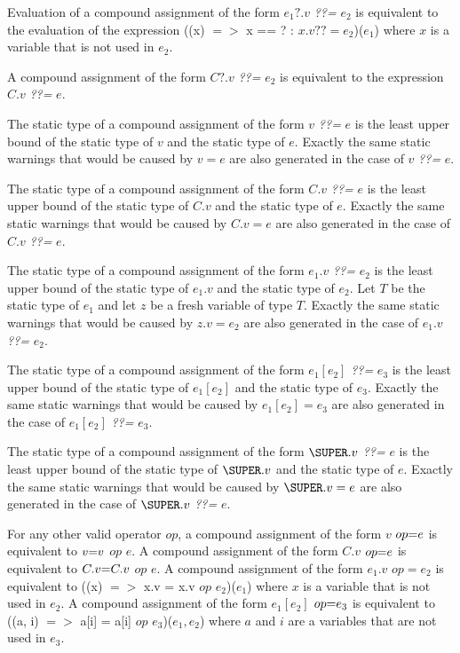 \documentclass{article}
\newcommand{\code}[1]{{\sf #1}}
\begin{document}
\LMHash{}
Evaluation of a compound assignment of the form $e_1?.v$  {\em ??=} $e_2$ is equivalent to the evaluation of the expression \code{((x) $=>$ x == \NULL{} ?  \NULL: $x.v ??=  e_2$)($e_1$)} where $x$ is a variable that is not used in $e_2$.

\LMHash{}
A compound assignment of the form $C?.v$  {\em ??=} $e_2$ is equivalent to the expression $C.v$ {\em ??=} $e$.

\LMHash{}
The static type of a compound assignment of the form $v$ {\em ??=} $e$ is the least upper bound of the static type of $v$ and the static type of $e$.  Exactly the same static warnings that would be caused by $v = e$ are also generated in the case of $v$ {\em ??=} $e$.


\LMHash{}
The static type of a compound assignment of the form  $C.v$ {\em ??=} $e$  is the least upper bound of the static type of $C.v$ and the static type of $e$.  Exactly the same static warnings that would be caused by $C.v = e$ are also generated in the case of $C.v$ {\em ??=} $e$.

\LMHash{}
The static type of a compound assignment of the form $e_1.v$  {\em ??=} $e_2$ is the least upper bound of the static type of $e_1.v$ and the static type of $e_2$. Let $T$ be the static type of $e_1$ and let $z$ be a fresh variable of type $T$. Exactly the same static warnings that would be caused by $z.v = e_2$ are also generated in the case of $e_1.v$  {\em ??=} $e_2$.

\LMHash{}
The static type of a compound assignment of the form $e_1[e_2]$  {\em ??=} $e_3$  is the least upper bound of the static type of $e_1[e_2]$ and the static type of $e_3$. Exactly the same static warnings that would be caused by $e_1[e_2] = e_3$ are also generated in the case of $e_1[e_2]$  {\em ??=} $e_3$.

\LMHash{}
The static type of a compound assignment of the form $\SUPER.v$  {\em ??=} $e$  is the least upper bound of the static type of $\SUPER.v$ and the static type of $e$. Exactly the same static warnings that would be caused by $\SUPER.v = e$ are also generated in the case of $\SUPER.v$  {\em ??=} $e$.

\LMHash{}
For any other valid operator $op$, a compound assignment of the form $v$ $op\code{=} e$ is equivalent to $v \code{=} v$ $op$ $e$. A compound assignment of the form $C.v$ $op \code{=} e$ is equivalent to $C.v \code{=} C.v$ $op$ $e$. A compound assignment of the form $e_1.v$ $op = e_2$ is equivalent to \code{((x) $=>$ x.v = x.v $op$ $e_2$)($e_1$)} where $x$ is a variable that is not used in $e_2$. A compound assignment of the form  $e_1[e_2]$ $op\code{=} e_3$ is equivalent to
\code{((a, i) $=>$ a[i] = a[i] $op$ $e_3$)($e_1, e_2$)} where $a$ and $i$ are a variables that are not used in $e_3$.
\end{document}
